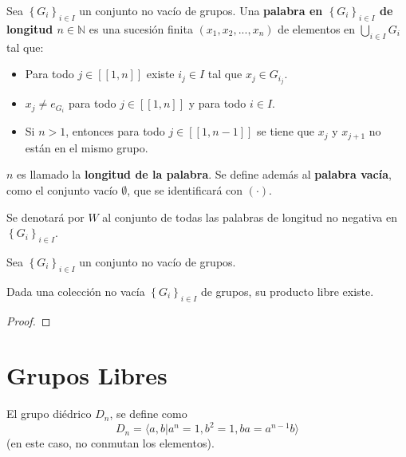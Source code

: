 \documentclass[12pt]{report}
\theoremstyle{largebreak}
\newcommand\natint[1]{\ensuremath{\left[\!\left[ #1\right]\!\right]}}
\begin{document}
    \begin{mydef}
        Sea $\left\{ G_i \right\}_{ i\in I}$ un conjunto no vacío de grupos. Una \textbf{palabra en $\left\{ G_i \right\}_{ i\in I}$ de longitud $n\in\mathbb{N}$} es una sucesión finita $(x_1,x_2,...,x_n)$ de elementos en $\bigcup_{ i\in I}G_i$ tal que:
        \begin{itemize}
            \item Para todo $j\in\natint{1,n}$ existe $i_j\in I$ tal que $x_j\in G_{ i_j}$.
            \item $x_j\neq e_{ G_i}$ para todo $j\in\natint{1,n}$ y para todo $i\in I$.
            \item Si $n>1$, entonces para todo $j\in\natint{1,n-1}$ se tiene que $x_j$ y $x_{ j+1}$ no están en el mismo grupo.
        \end{itemize}
        $n$ es llamado la \textbf{longitud de la palabra}. Se define además al \textbf{palabra vacía}, como el conjunto vacío $\emptyset$, que se identificará con $(\cdot)$.

        Se denotará por $W$ al conjunto de todas las palabras de longitud no negativa en $\left\{G_i \right\}_{ i\in I}$.
    \end{mydef}

    \begin{propo}
        Sea $\left\{ G_i \right\}_{ i\in I}$ un conjunto no vacío de grupos.
    \end{propo}

    \begin{theor}
        Dada una colección no vacía $\left\{ G_i \right\}_{ i\in I}$ de grupos, su producto libre existe.
    \end{theor}
    
    \begin{proof}
        
    \end{proof}


    \section{Grupos Libres}

    \begin{exa}
        El grupo diédrico $D_n$, se define como
        \begin{equation*}
            D_n=\langle a,b\Big|a^n=1,b^2=1,ba=a^{n-1}b \rangle
        \end{equation*}
        (en este caso, no conmutan los elementos).
    \end{exa}
\end{document}
